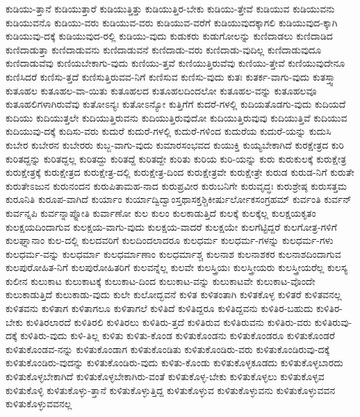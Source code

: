 {ಕುಡಿಯು-ತ್ತಾನೆ
ಕುಡಿಯುತ್ತಾರೆ
ಕುಡಿಯುತ್ತಿತ್ತು
ಕುಡಿಯುತ್ತಿರ-ಬೇಕು
ಕುಡಿಯು-ತ್ತೇವೆ
ಕುಡಿಯುವ
ಕುಡಿಯುವನು
ಕುಡಿಯುವನೊ
ಕುಡಿಯು-ವರು
ಕುಡಿಯುವ-ವರು
ಕುಡಿಯುವ-ವರೆಗೆ
ಕುಡಿಯುವುದಕ್ಕಾಗಲಿ
ಕುಡಿಯುವುದ-ಕ್ಕಾಗಿ
ಕುಡಿಯುವು-ದಕ್ಕೆ
ಕುಡಿಯುವುದ-ರಲ್ಲಿ
ಕುಡಿಯು-ವುದು
ಕುಡುಕರು
ಕುಡುಗೋಲನ್ನು
ಕುಣಿದಾಡಲು
ಕುಣಿದಾಡಿದ
ಕುಣಿದಾಡುತ್ತಾ
ಕುಣಿದಾಡುವನು
ಕುಣಿದಾಡುವನೆ
ಕುಣಿದಾಡು-ವರು
ಕುಣಿದಾಡು-ವುದಿಲ್ಲ
ಕುಣಿದಾಡುವುದೂ
ಕುಣಿದಾಡುವೆವು
ಕುಣಿಯಬೇಕಾಗು-ವುದು
ಕುಣಿಯು-ತ್ತವೆ
ಕುಣಿಯುತ್ತಿರುವೆವು
ಕುಣಿಯು-ತ್ತೇವೆ
ಕುಣಿಯುವುದೇನೂ
ಕುಣಿಸಿದರೆ
ಕುಣಿಸು-ತ್ತದೆ
ಕುಣಿಸುತ್ತಿರುವವ-ನಿಗೆ
ಕುಣಿಸುವ
ಕುಣಿಸು-ವುದು
ಕುತಃ
ಕುತರ್ಕ-ವಾಗು-ವುದು
ಕುತಸ್ತ್ವಾ
ಕುತೂಹಲ
ಕುತೂಹಲ-ವಾ-ಯಿತು
ಕುತೂಹಲದ
ಕುತೂಹಲದಿಂದಲೋ
ಕುತೂಹಲ-ವನ್ನು
ಕುತೂಹಲವೂ
ಕುತೂಹಲಿಗಳಾಗಿರುವೆವು
ಕುತೋಽನ್ಯಃ
ಕುತೋಽನ್ಯೋ
ಕುತ್ತಿಗೆಗೆ
ಕುದರೆ-ಗಳಲ್ಲಿ
ಕುದಿಯತೊಡಗು-ವುದು
ಕುದಿಯದೆ
ಕುದಿಯು
ಕುದಿಯುತ್ತಲೇ
ಕುದಿಯುತ್ತಿರುವನು
ಕುದಿಯುತ್ತಿರುವುದೋ
ಕುದಿಯುತ್ತಿರುವುವು
ಕುದಿಯುತ್ತಿವೆ
ಕುದಿಯುವ
ಕುದಿಯುವು-ದಕ್ಕೆ
ಕುದಿಸು-ವರು
ಕುದುರೆ
ಕುದುರೆ-ಗಳಲ್ಲಿ
ಕುದುರೆ-ಗಳಿಂದ
ಕುದುರೆಯ
ಕುದುರೆ-ಯನ್ನು
ಕುದುಸಿ
ಕುಬೇರ
ಕುಬೇರನ
ಕುಬೇರರು
ಕುಬ್ಜ-ವಾಗು-ವುದು
ಕುಮಾರಸಂಭವದ
ಕುಯುಕ್ತಿ
ಕುಯ್ಯಬೇಕಾಗಿದೆ
ಕುರಕ್ಷೇತ್ರದ
ಕುರಿ
ಕುರಿತದ್ದನ್ನು
ಕುರಿತದ್ದಲ್ಲ
ಕುರಿತದ್ದು
ಕುರಿತದ್ದೆ
ಕುರಿತದ್ದೇ
ಕುರಿತು
ಕುರಿಯ
ಕುರಿ-ಯನ್ನು
ಕುರು
ಕುರುಕುಲಕ್ಕೆ
ಕುರುಕ್ಷೇತ್ರ
ಕುರುಕ್ಷೇತ್ರಕ್ಕೆ
ಕುರುಕ್ಷೇತ್ರದ
ಕುರುಕ್ಷೇತ್ರ-ದಲ್ಲಿ
ಕುರುಕ್ಷೇತ್ರ-ದಿಂದ
ಕುರುಕ್ಷೇತ್ರವೇ
ಕುರುಕ್ಷೇತ್ರೇ
ಕುರುಡ
ಕುರುಡ-ನಿಗೆ
ಕುರುತೇ
ಕುರುತೇಽಜುನ
ಕುರುನಂದನ
ಕುರುಪಿತಾಮಹ-ನಾದ
ಕುರುಪ್ರವೀರ
ಕುರುಬನಿಗೇ
ಕುರುವೃದ್ಧಃ
ಕುರುಶ್ರೇಷ್ಠ
ಕುರುಸತ್ತಮ
ಕುರೂನಿತಿ
ಕುರೂಪ-ವಾಗಿದೆ
ಕುರ್ಯಾಂ
ಕುರ್ಯಾದ್ವಿದ್ವಾಂಸ್ತಥಾಸಕ್ತಶ್ಚಿಕೀರ್ಷುರ್ಲೋಕಸಂಗ್ರಹಮ್
ಕುರ್ವಂತಿ
ಕುರ್ವನ್
ಕುರ್ವನ್ನಪಿ
ಕುರ್ವನ್ನಾಪ್ನೋತಿ
ಕುರ್ವಾಣೋ
ಕುಲ
ಕುಲಂ
ಕುಲಕಾಡುತ್ತಿದೆ
ಕುಲಕ್ಕೆ
ಕುಲಕ್ಕೆಲ್ಲ
ಕುಲಕ್ಷಯಕೃತಂ
ಕುಲಕ್ಷಯದಿಂದಾಗುವ
ಕುಲಕ್ಷಯ-ವಾಗು-ವುದು
ಕುಲಕ್ಷಯ-ವಾದರೆ
ಕುಲಕ್ಷಯೇ
ಕುಲಗೆಟ್ಟಿದ್ದರೆ
ಕುಲಗೋತ್ರ-ಗಳಿಗೆ
ಕುಲಘ್ನಾನಾಂ
ಕುಲ-ದಲ್ಲಿ
ಕುಲದವರಿಗೆ
ಕುಲದಿಂದಲಾದರೂ
ಕುಲಧರ್ಮ
ಕುಲಧರ್ಮ-ಗಳನ್ನು
ಕುಲಧರ್ಮ-ಗಳು
ಕುಲಧರ್ಮ-ವನ್ನು
ಕುಲಧರ್ಮಾ
ಕುಲಧರ್ಮಾಣಾಂ
ಕುಲಧರ್ಮಾಶ್ಚ
ಕುಲನಾಶ
ಕುಲನಾಶಕರ
ಕುಲನಾಶದಿಂದಾಗುವ
ಕುಲಪುರೋಹಿತ-ನಿಗೆ
ಕುಲಪುರೋಹಿತರಿಗೆ
ಕುಲವನ್ನೆಲ್ಲ
ಕುಲವೇ
ಕುಲಸ್ತ್ರಿಯಃ
ಕುಲಸ್ತ್ರೀಯರು
ಕುಲಸ್ತ್ರೀಯರೆಲ್ಲ
ಕುಲಸ್ಯ
ಕುಲೀನ
ಕುಲುಕಾಟ
ಕುಲುಕಾಟಕ್ಕೆ
ಕುಲುಕಾಟ-ದಿಂದ
ಕುಲುಕಾಟ-ವನ್ನು
ಕುಲುಕಾಟವೇ
ಕುಲುಕಾಟ-ವೊಂದೇ
ಕುಲುಕಾಡುತ್ತಿದೆ
ಕುಲುಕಾಡು-ವುದು
ಕುಲೇ
ಕುಲೋದ್ಭವನೆ
ಕುಳಿತ
ಕುಳಿತಂತಾಗಿ
ಕುಳಿತಕೊಳ್ಳ
ಕುಳಿತರೆ
ಕುಳಿತವನಲ್ಲ
ಕುಳಿತವನು
ಕುಳಿತಾಗ
ಕುಳಿತಾಗಲೂ
ಕುಳಿತಾಗಲೆ
ಕುಳಿತಿದೆ
ಕುಳಿತಿದ್ದರೂ
ಕುಳಿತಿದ್ದವನು
ಕುಳಿತಿರ-ಬಹುದು
ಕುಳಿತಿರ-ಬೇಕು
ಕುಳಿತಿರಲಾರದೆ
ಕುಳಿತಿರಲಿ
ಕುಳಿತಿರಲು
ಕುಳಿತಿರು-ತ್ತದೆ
ಕುಳಿತಿರುವ
ಕುಳಿತಿರುವನು
ಕುಳಿತಿರು-ವರು
ಕುಳಿತಿರುವು-ದಕ್ಕೆ
ಕುಳಿತಿರು-ವುದು
ಕುಳಿ-ತಿಲ್ಲ
ಕುಳಿತು
ಕುಳಿತು-ಕೊಂಡ
ಕುಳಿತುಕೊಂಡನು
ಕುಳಿತುಕೊಂಡರೂ
ಕುಳಿತುಕೊಂಡರೆ
ಕುಳಿತುಕೊಂಡವ-ನನ್ನು
ಕುಳಿತುಕೊಂಡಾಗ
ಕುಳಿತುಕೊಂಡಿತು
ಕುಳಿತುಕೊಂಡಿರು-ವರು
ಕುಳಿತುಕೊಂಡಿರುವು-ದಕ್ಕೆ
ಕುಳಿತುಕೊಂಡಿರು-ವುದನ್ನು
ಕುಳಿತುಕೊಂಡಿರು-ವುದು
ಕುಳಿತು-ಕೊಂಡು
ಕುಳಿತುಕೊಳ್ಳಕೂಡದು
ಕುಳಿತುಕೊಳ್ಳಬಾರದು
ಕುಳಿತುಕೊಳ್ಳಬೇಕಾಗಿದೆ
ಕುಳಿತುಕೊಳ್ಳಬೇಕಾಗಿರು-ವಂತೆ
ಕುಳಿತುಕೊಳ್ಳ-ಬೇಕು
ಕುಳಿತುಕೊಳ್ಳಲು
ಕುಳಿತುಕೊಳ್ಳವ
ಕುಳಿತುಕೊಳ್ಳಿ
ಕುಳಿತುಕೊಳ್ಳು-ತ್ತಾನೆ
ಕುಳಿತುಕೊಳ್ಳುತ್ತಿದ್ದ
ಕುಳಿತುಕೊಳ್ಳುವ
ಕುಳಿತುಕೊಳ್ಳುವನು
ಕುಳಿತುಕೊಳ್ಳುವವನ
ಕುಳಿತುಕೊಳ್ಳುವವನಲ್ಲ
}
